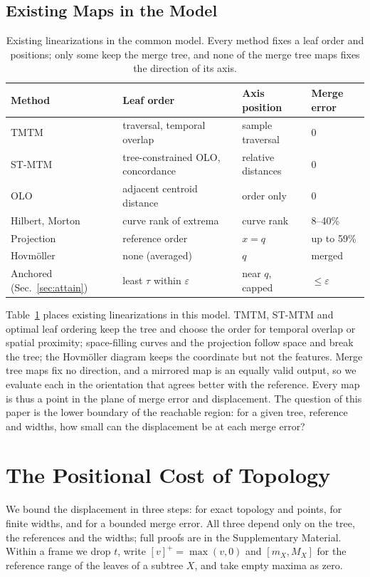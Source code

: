 \documentclass[review]{vgtc}
\begin{document}
\subsection{Existing Maps in the Model}
\begin{table}[t]
\caption{Existing linearizations in the common model. Every method fixes a leaf order and positions; only some keep the merge tree, and none of the merge tree maps fixes the direction of its axis.}\label{tab:methods}
\centering\scriptsize\setlength{\tabcolsep}{2.5pt}
\begin{tabular}{@{}p{}p{}p{}p{}@{}}\toprule
Method & Leaf order & Axis position & Merge error\\\midrule
TMTM~\cite{Koepp:2023:TMTM} & traversal, temporal overlap & sample traversal & 0\\
ST-MTM~\cite{STMTM:2026} & tree-constrained OLO, concordance & relative distances & 0\\
OLO~\cite{BarJoseph:2001:OLO} & adjacent centroid distance & order only & 0\\
Hilbert, Morton & curve rank of extrema & curve rank & 8--40\%\\
Projection & reference order & $x=q$ & up to 59\%\\
Hovm\"oller & none (averaged) & $q$ & merged\\
Anchored (Sec.~\ref{sec:attain}) & least $\tau$ within $\varepsilon$ & near $q$, capped & $\le\varepsilon$\\\bottomrule
\end{tabular}
\end{table}
Table~\ref{tab:methods} places existing linearizations in this model. TMTM, ST-MTM and optimal leaf ordering keep the tree and choose the order for temporal overlap or spatial proximity; space-filling curves and the projection follow space and break the tree; the Hovm\"oller diagram keeps the coordinate but not the features. Merge tree maps fix no direction, and a mirrored map is an equally valid output, so we evaluate each in the orientation that agrees better with the reference. Every map is thus a point in the plane of merge error and displacement. The question of this paper is the lower boundary of the reachable region: for a given tree, reference and widths, how small can the displacement be at each merge error?

\section{The Positional Cost of Topology}\label{sec:bounds}
We bound the displacement in three steps: for exact topology and points, for finite widths, and for a bounded merge error. All three depend only on the tree, the references and the widths; full proofs are in the Supplementary Material. Within a frame we drop $t$, write $[v]^+=\max(v,0)$ and $[m_X,M_X]$ for the reference range of the leaves of a subtree $X$, and take empty maxima as zero.
\end{document}

